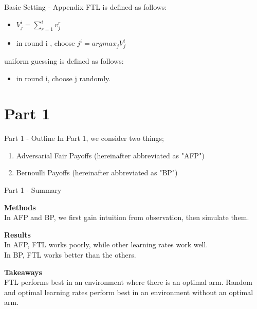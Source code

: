 \documentclass{beamer}
\begin{document}
\begin{frame}{Basic Setting - Appendix}
    FTL is defined as follows:
    \begin{itemize}
        \item $V_j^i = \sum_{r=1}^i v_j^r$
        \item in round i , choose $j^i = argmax_j V_j^i$
    \end{itemize}
    uniform guessing is defined as follows:
    \begin{itemize}
      \item in round i, choose j randomly.
    \end{itemize}
\end{frame}


\section{Part 1}
\begin{frame}{Part 1 - Outline}
In Part 1, we consider two things;
\begin{enumerate}
    \item Adversarial Fair Payoffs (hereinafter abbreviated as "AFP") 
    \item Bernoulli Payoffs (hereinafter abbreviated as "BP")
\end{enumerate}
\end{frame}

\begin{frame}{Part 1 - Summary}

\textbf{Methods}\\
In AFP and BP, we first gain intuition from observation, then simulate them.
\vspace{1em}

\textbf{Results}\\
In AFP, FTL works poorly, while other learning rates work well.\\
In BP, FTL works better than the others.
\vspace{1em}

\textbf{Takeaways}\\
FTL performs best in an environment where there is an optimal arm. Random and optimal learning rates perform best in an environment without an optimal arm.

\end{frame}
\end{document}
